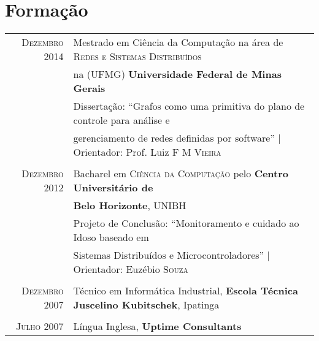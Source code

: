\documentclass[a4paper,10pt]{article} %
\begin{document}

\section{Formação}

\begin{tabular}{rl}
\textsc{Dezembro} 2014 & Mestrado em Ciência da Computação na área de
\textsc{Redes e Sistemas Distribuídos}
\\ & na (UFMG)
\textbf{Universidade Federal de Minas Gerais} \\
& Dissertação: ``Grafos como uma primitiva do plano de controle para análise e
\\ & gerenciamento de redes definidas por software''
| \small Orientador: Prof. Luiz \textsc{F M Vieira} \\
&\\


\textsc{Dezembro} 2012& Bacharel em \textsc{Ciência da Computação}
pelo \normalsize\textbf{Centro Universitário de}
\\ & \textbf{Belo Horizonte}, UNIBH \\
& Projeto de Conclusão: ``Monitoramento e cuidado ao Idoso baseado em
\\ & Sistemas Distribuídos e Microcontroladores''
| \small Orientador: Euzébio \textsc{Souza} \\
&\\


\textsc{Dezembro} 2007 & Técnico em Informática Industrial,
\textbf{Escola Técnica Juscelino Kubitschek}, Ipatinga \\
&\\


\textsc{Julho} 2007 & Língua Inglesa, \textbf{Uptime Consultants}
\end{tabular}




\end{document}
